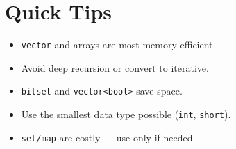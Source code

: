 \documentclass[12pt,a4paper]{article}
\begin{document}
\section{Quick Tips}
\begin{itemize}
    \item \texttt{vector} and arrays are most memory-efficient.
    \item Avoid deep recursion or convert to iterative.
    \item \texttt{bitset} and \texttt{vector<bool>} save space.
    \item Use the smallest data type possible (\texttt{int}, \texttt{short}).
    \item \texttt{set/map} are costly — use only if needed.
\end{itemize}
\end{document}
